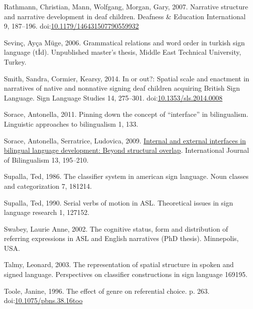 \documentclass[]{elsarticle} %
\newlength{\cslhangindent}
\newenvironment{CSLReferences}[2] %
 {%
  \setlength{\parindent}{0pt}
  \ifodd #1 \everypar{\setlength{\hangindent}{\cslhangindent}}\ignorespaces\fi
  \ifnum #2 > 0
  \setlength{\parskip}{#2\baselineskip}
  \fi
 }%
 {}
\begin{document}
\begin{CSLReferences}{1}{0}
\leavevmode{}%
Rathmann, Christian, Mann, Wolfgang, Morgan, Gary, 2007. Narrative
structure and narrative development in deaf children. Deafness \&
Education International 9, 187--196.
doi:\href{https://doi.org/10.1179/146431507790559932}{10.1179/146431507790559932}

\leavevmode{}%
Sevinç, Ayça Müge, 2006. Grammatical relations and word order in turkish
sign language (t{İ}d). Unpublished master's thesis, Middle East
Technical University, Turkey.

\leavevmode{}%
Smith, Sandra, Cormier, Kearsy, 2014. In or out?: Spatial scale and
enactment in narratives of native and nonnative signing deaf children
acquiring British Sign Language. Sign Language Studies 14, 275--301.
doi:\href{https://doi.org/10.1353/sls.2014.0008}{10.1353/sls.2014.0008}

\leavevmode{}%
Sorace, Antonella, 2011. Pinning down the concept of {``}interface{''}
in bilingualism. Linguistic approaches to bilingualism 1, 133.

\leavevmode{}%
Sorace, Antonella, Serratrice, Ludovica, 2009.
\href{https://doi.org/10.1177/1367006909339810}{Internal and external
interfaces in bilingual language development: Beyond structural
overlap}. International Journal of Bilingualism 13, 195--210.

\leavevmode{}%
Supalla, Ted, 1986. The classifier system in american sign language.
Noun classes and categorization 7, 181214.

\leavevmode{}%
Supalla, Ted, 1990. Serial verbs of motion in ASL. Theoretical issues in
sign language research 1, 127152.

\leavevmode{}%
Swabey, Laurie Anne, 2002. The cognitive status, form and distribution
of referring expressions in ASL and English narratives (PhD thesis).
Minnepolis, USA.

\leavevmode{}%
Talmy, Leonard, 2003. The representation of spatial structure in spoken
and signed language. Perspectives on classifier constructions in sign
language 169195.

\leavevmode{}%
Toole, Janine, 1996. The effect of genre on referential choice. p. 263.
doi:\href{https://doi.org/10.1075/pbns.38.16too}{10.1075/pbns.38.16too}


\end{CSLReferences}
\end{document}
